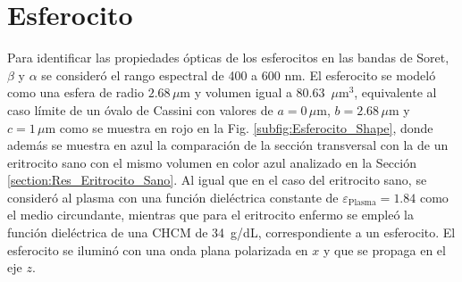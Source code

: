
\section{Esferocito}
\label{section:Res_Esferocito}


Para identificar las propiedades ópticas de los esferocitos en las bandas de Soret, $\beta$ y $\alpha$ se consideró el rango espectral de 400  a 600 nm. El esferocito se modeló como una esfera de radio $2.68\,\mu\text{m}$ y volumen igual a 80.63~$\mu\text{m}^3$, equivalente al caso límite de un óvalo de Cassini con valores de $a=0\,\mu\text{m}$, $b=2.68\,\mu\text{m}$ y $c=1\,\mu\text{m}$ como se muestra en rojo en la Fig. \ref{subfig:Esferocito_Shape}, donde además se muestra en azul la comparación de la sección transversal con la de un eritrocito sano con el mismo volumen en color azul analizado en la Sección \ref{section:Res_Eritrocito_Sano}. Al igual que en el caso del eritrocito sano, se consideró al plasma con una función dieléctrica constante de $\varepsilon_{\text{Plasma}}=1.84$ como el medio circundante, mientras que para el eritrocito enfermo se empleó la función dieléctrica de una CHCM de 34~g/dL, correspondiente a un esferocito. El esferocito se iluminó con una onda plana polarizada en $x$ y que se propaga en el eje $z$.

